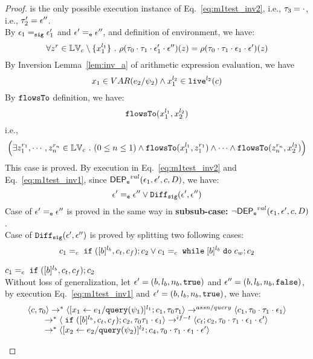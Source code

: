 {\begin{proof}
is the only possible execution instance of Eq.~\ref{eq:m1test_inv2}, i.e., $\mathtt{\tau}_3 = \cdot$, i.e., $\mathtt{\tau}_2' = \mathtt{\epsilon}''$.
\\
By $\mathtt{\epsilon}_1 =_{\mathtt{sig}} \mathtt{\epsilon}_1'$ and $\mathtt{\epsilon}' =_{\mathtt{e}} \mathtt{\epsilon}''$, and definition of environment, we have:
\[
  \forall z^r \in \mathbb{LV}_c \setminus \{x_1^{l_1}\} ~.~
  \rho(\mathtt{\tau}_0 \cdot \mathtt{\tau}_1 \cdot \mathtt{\epsilon}_1' \cdot \mathtt{\epsilon}'') (z) =  
  \rho(\mathtt{\tau}_0 \cdot \mathtt{\tau}_1 \cdot \mathtt{\epsilon}_1 \cdot \mathtt{\epsilon}') (z)
\]
By {Inversion Lemma~\ref{lem:inv_a}} of arithmetic expression evaluation, we have 
\[
  x_1 \in VAR(e_2 / \psi_2) \land x_1^{l_2} \in \mathtt{live}^{l_2}(c)
\]
%
By $\mathtt{flowsTo}$ definition, we have:
%
\[
\mathtt{flowsTo}(x_1^{l_1}, {x}_2^{l_2})
\]
i.e.,
%
\[
\Big(\exists z_1^{r_1}, \cdots, z_n^{r_n} \in \mathbb{LV}_{{c}} ~.~ (0 \leq n \leq 1 )
 \land \mathtt{flowsTo}(x_1^{l_1}, z_1^{r_1}) \land \cdots \land \mathtt{flowsTo}(z_n^{r_n}, {x}_2^{l_2}) \Big)
\]
%
This case is proved.
%
%
By execution in Eq.~\ref{eq:m1test_inv2} and Eq.~\ref{eq:m1test_inv1}, since $\mathsf{DEP_{\mathtt{e}}}^{val}(\mathtt{\epsilon}_1, \mathtt{\epsilon}', c, D)$, we have:
\[
  \mathtt{\epsilon}' =_{\mathtt{e}} \mathtt{\epsilon}'' \lor \mathtt{Diff}_{\mathtt{sig}}(\mathtt{\epsilon}', \mathtt{\epsilon}'')
\]
%
Case of $\mathtt{\epsilon}' =_{\mathtt{e}} \mathtt{\epsilon}''$ is proved in the same way in \textbf{subsub-case:} $\neg \mathsf{DEP_{\mathtt{e}}}^{val}(\mathtt{\epsilon}_1, \mathtt{\epsilon}', c, D)$.
\\
Case of $\mathtt{Diff}_{\mathtt{sig}}(\mathtt{\epsilon}', \mathtt{\epsilon}'')$ is proved by splitting two following cases:
\[
  c_1 =_c \;\mathtt{if}\; ([b]^{l_b}, c_t, c_f);{c}_2
  \lor
  c_1 =_c \;\mathtt{while}\; [b]^{l_b} \;\mathtt{do}\; c_w;{c}_2
\]
\begin{subproof} 
%
$c_1 =_c \;\mathtt{if}\; ([b]^{l_b}, c_t, c_f);{c}_2$ 
\\
Without loss of generalization, 
let $\mathtt{\epsilon}' = (b, l_b, n_b, \mathtt{true})$ and
$\mathtt{\epsilon}'' = (b, l_b, n_b, \mathtt{false})$,
by execution Eq.~\ref{eq:m1test_inv1} and $\mathtt{\epsilon}' = (b, l_b, n_b, \mathtt{true})$, we have:
\[
  \begin{array}{l}   
  \langle {c}, \mathtt{\tau}_0 \rangle \rightarrow^{*} 
  \langle [\mathrel{ {x}_1 \leftarrow e_1 / {\tt query}(\psi_1) }]^{l_1} ; {c}_1, \mathtt{\tau}_0 \mathtt{\tau}_1 \rangle  
  \rightarrow^{assn/query}
  \langle c_1, \mathtt{\tau}_0 \cdot \mathtt{\tau}_1 \cdot \mathtt{\epsilon}_1 \rangle 
  \\
  \qquad \rightarrow^{*} 
  \langle \;\mathtt{if}\; ([b]^{l_b}, c_t, c_f);{c}_2, \mathtt{\tau}_0 \mathtt{\tau}_1 \cdot \mathtt{\epsilon}_1 \rangle 
  \rightarrow^{if-t} 
  \langle c_t;c_2, \mathtt{\tau}_0 \cdot \mathtt{\tau}_1 \cdot \mathtt{\epsilon}_1 \cdot \mathtt{\epsilon}' \rangle 
  \\
  \qquad \rightarrow^{*} 
  \langle [\mathrel{ {x}_2 \leftarrow e_2 / {\tt query}(\psi_2) }]^{l_2};{c}_4, 
  \mathtt{\tau}_0 \cdot \mathtt{\tau}_1 \cdot \mathtt{\epsilon}_1 \cdot \mathtt{\epsilon}' \rangle 

\end{array}\]
\end{subproof}
\end{proof}}
